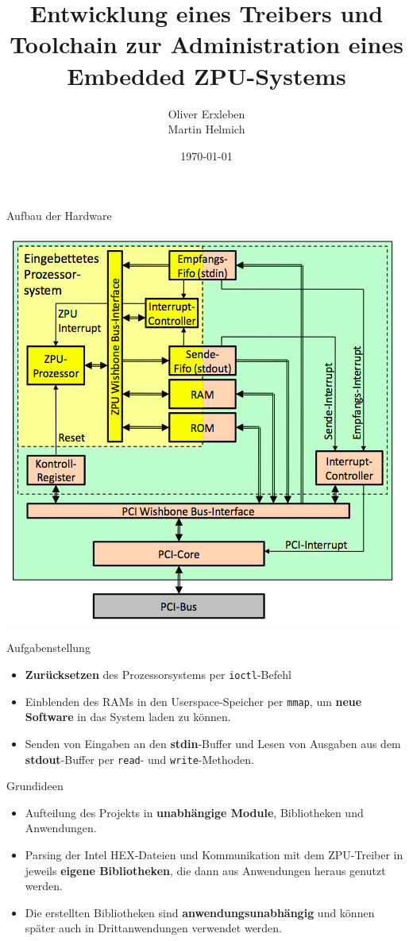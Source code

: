 \documentclass[10pt]{beamer}
\title{Entwicklung eines Treibers und Toolchain zur Administration eines Embedded ZPU-Systems}
\author{Oliver Erxleben\\Martin Helmich}
\institute{Hochschule Osnabrück}
\date{\today}
\begin{document}
	\frame{\titlepage}
	
	\begin{frame}{Aufbau der Hardware}
		\begin{center}
		\includegraphics[height=0.9\textheight]{images/zpu_architecture.png}
		\end{center}
	\end{frame}
	
	\begin{frame}{Aufgabenstellung}
		\begin{itemize}
			\item \textbf{Zurücksetzen} des Prozessorsystems per \texttt{ioctl}-Befehl
			\item Einblenden des RAMs in den Userspace-Speicher per \texttt{mmap}, um \textbf{neue Software} in das System laden zu können.
			\item Senden von Eingaben an den \textbf{stdin}-Buffer und Lesen von Ausgaben aus dem \textbf{stdout}-Buffer per \texttt{read}- und \texttt{write}-Methoden.
		\end{itemize}
	\end{frame}
	
	\begin{frame}{Grundideen}
		\begin{itemize}
			\item Aufteilung des Projekts in \textbf{unabhängige Module}, Bibliotheken und Anwendungen.
			\item Parsing der Intel HEX-Dateien und Kommunikation mit dem ZPU-Treiber in jeweils \textbf{eigene Bibliotheken}, die dann aus Anwendungen heraus genutzt werden.
			\item Die erstellten Bibliotheken sind \textbf{anwendungsunabhängig} und können später auch in Drittanwendungen verwendet werden.
		\end{itemize}
	\end{frame}
\end{document}
